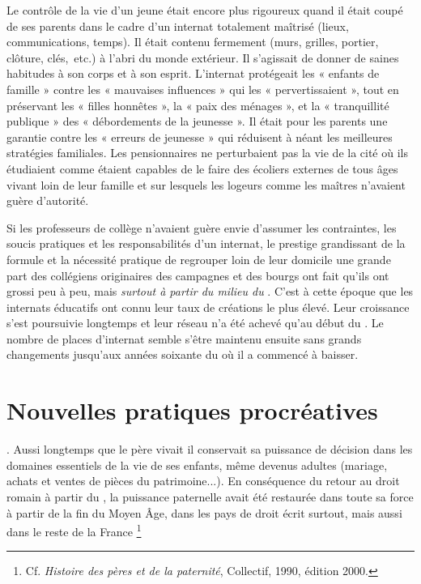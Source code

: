   Le contrôle de la vie d'un jeune était encore plus rigoureux quand il était coupé de ses parents dans le cadre d'un internat totalement maîtrisé (lieux, communications, temps). Il était contenu fermement (murs, grilles, portier, clôture, clés,~etc.) à l'abri du monde extérieur. Il s'agissait de donner de saines habitudes à son corps et à son esprit.  L'internat protégeait les « enfants de famille » contre les « mauvaises influences » qui les « pervertissaient », tout en préservant les « filles honnêtes », la « paix des ménages », et la « tranquillité publique » des « débordements de la jeunesse ». Il était pour les parents une garantie contre les « erreurs de jeunesse » qui réduisent à néant les meilleures stratégies familiales. Les pensionnaires ne perturbaient pas la vie de la cité où ils étudiaient comme étaient capables de le faire des écoliers externes de tous âges vivant loin de leur famille et sur lesquels les logeurs comme les maîtres n'avaient guère d'autorité. 
  
  Si les professeurs de collège n'avaient guère envie d'assumer les contraintes, les soucis pratiques et les responsabilités d'un internat, le prestige grandissant de la formule et la nécessité pratique de regrouper loin de leur domicile une grande part des collégiens originaires des campagnes et des bourgs  ont fait qu'ils ont grossi peu à peu, mais \emph{surtout à partir du milieu du }. C'est à cette époque que les internats éducatifs ont connu leur taux de créations le plus élevé. Leur croissance s'est poursuivie longtemps et leur réseau n'a été achevé qu'au début du . Le nombre de places d'internat semble s'être maintenu ensuite sans grands changements jusqu'aux années soixante du  où il a commencé à baisser.
  
 \section{Nouvelles pratiques procréatives}

 
. Aussi longtemps que le père vivait il conservait sa puissance de décision dans les domaines essentiels de la vie de ses enfants, même devenus adultes (mariage, achats et ventes de pièces du patrimoine...). En conséquence du retour au droit romain à partir du , la puissance paternelle avait été restaurée dans toute sa force à partir de la fin du Moyen Âge, dans les pays de droit écrit surtout, mais aussi dans le reste de la France
\footnote{Cf. \emph{Histoire des pères et de la paternité}, Collectif, 1990, édition 2000.}%

